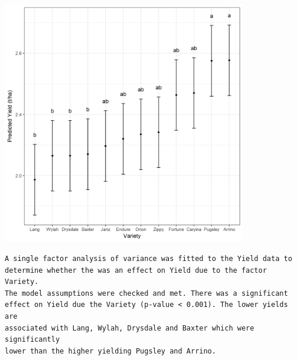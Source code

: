 \documentclass[a4paper, 10pt, fleqn, twosided]{memoir}
\begin{document}
\begin{tcolorbox}[title = Exercise 1 output continued]
\includegraphics[width=0.8\textwidth, frame]{Exercise1Pred.png}

\end{tcolorbox}

\begin{tcolorbox}[title = Exercise 1 interpretation]
\begin{verbatim}
A single factor analysis of variance was fitted to the Yield data to
determine whether the was an effect on Yield due to the factor Variety.
The model assumptions were checked and met. There was a significant
effect on Yield due the Variety (p-value < 0.001). The lower yields are
associated with Lang, Wylah, Drysdale and Baxter which were significantly
lower than the higher yielding Pugsley and Arrino.
\end{verbatim}
\end{tcolorbox}
\end{document}
